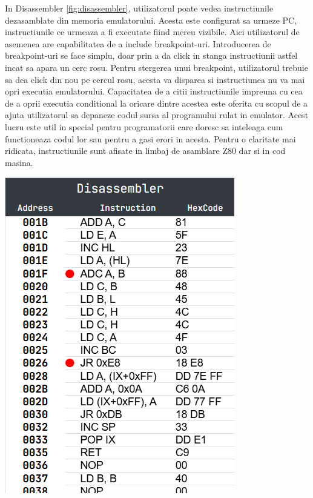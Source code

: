 \documentclass[titlepage,12pt]{article}
\begin{document}
\begin{minipage}{0.55\textwidth} %
In Disassembler \cref{fig:disassembler}, utilizatorul poate vedea instructiunile dezasamblate din memoria emulatorului. Acesta este configurat sa urmeze PC, instructiunile ce urmeaza a fi executate fiind mereu vizibile. Aici utilizatorul de asemenea are capabilitatea de a include breakpoint-uri. Introducerea de breakpoint-uri se face simplu, doar prin a da click in stanga instructiunii astfel incat sa apara un cerc rosu. Pentru stergerea unui breakpoint, utilizatorul trebuie sa dea click din nou pe cercul rosu, acesta va disparea si instructiunea nu va mai opri executia emulatorului. Capacitatea de a citii instructiunile impreuna cu cea de a oprii executia conditional la oricare dintre acestea este oferita cu scopul de a ajuta utilizatorul sa depaneze codul sursa al programului rulat in emulator. Acest lucru este util in special pentru programatorii care doresc sa inteleaga cum functioneaza codul lor sau pentru a gasi erori in acesta. Pentru o claritate mai ridicata, instructiunile sunt afisate in limbaj de asamblare Z80 dar si in cod masina.
\end{minipage}%
\hfill
\begin{minipage}{0.4\textwidth} %
\centering
\includegraphics[width=\linewidth]{images/disassembler.png}
\label{fig:disassembler}
\end{minipage}
\end{document}
